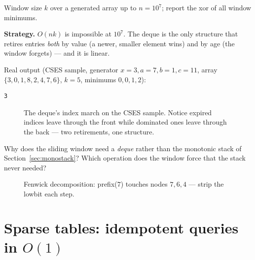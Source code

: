 \begin{lstlisting}[language=C++,caption={\texttt{monodeque.h}: window
minimums in $O(n)$.},label={lst:monodeque}]
\end{lstlisting}


\begin{example}\label{ex:slide}
Window size $k$ over a generated array up to $n=10^7$; report the xor
of all window minimums.
\par\smallskip
\textbf{Strategy.} $O(nk)$ is impossible at $10^7$. The deque is the
only structure that retires entries \emph{both} by value (a newer,
smaller element wins) and by age (the window forgets) --- and it is
linear.
\par\smallskip
\begin{solution}

Real output (CSES sample, generator $x{=}3,a{=}7,b{=}1,c{=}11$,
array $\{3,0,1,8,2,4,7,6\}$, $k{=}5$, minimums $0,0,1,2$):
\begin{lstlisting}[numbers=none]
3
\end{lstlisting}
\end{solution}
\end{example}

\begin{figure}[ht]\centering

\caption{The deque's index march on the CSES sample. Notice expired
indices leave through the front while dominated ones leave through the
back --- two retirements, one structure.}
\label{fig:deque}
\end{figure}

\begin{exercise}[medium]\label{exr:dequestack}
Why does the sliding window need a \emph{deque} rather than the
monotonic stack of Section~\ref{sec:monostack}? Which operation does
the window force that the stack never needed?
\end{exercise}


\begin{figure}[htbp]\centering

\caption{Fenwick decomposition: prefix($7$) touches nodes $7,6,4$ --- strip the lowbit each step.}
\label{fig:fenwquery}
\end{figure}

\section{Sparse tables: idempotent queries in \texorpdfstring{$O(1)$}{O(1)}}\label{sec:sparse}

